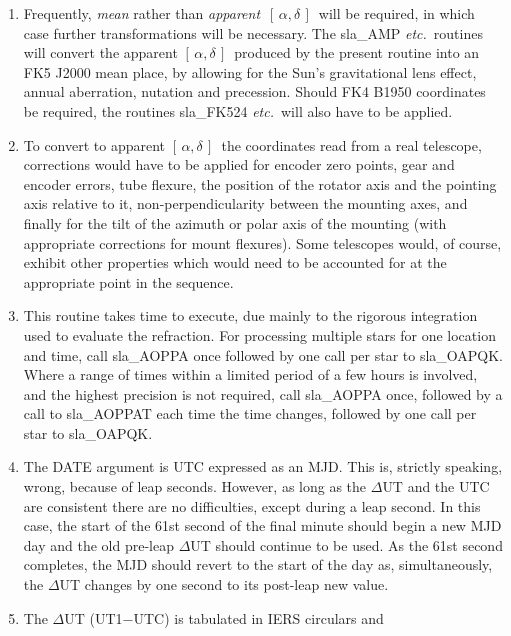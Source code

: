 \documentclass[11pt,twoside,nolof]{starlink}
\providecommand{\radec}     {$[\,\alpha,\delta\,]$}
\begin{document}
{\begin{enumerate}
  \item Frequently, \textit{mean}\/ rather than \textit{apparent}\,
        \radec\ will be required,
        in which case further transformations will be necessary.  The
        sla\_AMP \textit{etc.}\ routines will convert
        the apparent \radec\ produced
        by the present routine into an FK5 J2000 mean place, by
        allowing for the Sun's gravitational lens effect, annual
        aberration, nutation and precession.  Should FK4 B1950
        coordinates be required, the routines sla\_FK524 \textit{etc.}\ will also
        have to be applied.
  \item To convert to apparent \radec\ the coordinates read from a
        real telescope, corrections would have to be applied for
        encoder zero points, gear and encoder errors, tube flexure,
        the position of the rotator axis and the pointing axis
        relative to it, non-perpendicularity between the mounting
        axes, and finally for the tilt of the azimuth or polar axis
        of the mounting (with appropriate corrections for mount
        flexures).  Some telescopes would, of course, exhibit other
        properties which would need to be accounted for at the
        appropriate point in the sequence.
  \item This routine takes time to execute, due mainly to the
        rigorous integration used to evaluate the refraction.
        For processing multiple stars for one location and time,
        call sla\_AOPPA once followed by one call per star to sla\_OAPQK.
        Where a range of times within a limited period of a few hours
        is involved, and the highest precision is not required, call
        sla\_AOPPA once, followed by a call to sla\_AOPPAT each time the
        time changes, followed by one call per star to sla\_OAPQK.
  \item The DATE argument is UTC expressed as an MJD.  This is,
        strictly speaking, wrong, because of leap seconds.  However,
        as long as the $\Delta$UT and the UTC are consistent there
        are no difficulties, except during a leap second.  In this
        case, the start of the 61st second of the final minute should
        begin a new MJD day and the old pre-leap $\Delta$UT should
        continue to be used.  As the 61st second completes, the MJD
        should revert to the start of the day as, simultaneously,
        the $\Delta$UT changes by one second to its post-leap new value.
  \item The $\Delta$UT (UT1$-$UTC) is tabulated in IERS circulars and

\end{enumerate}}
\end{document}
